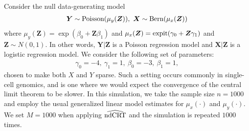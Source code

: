 \documentclass[aos]{imsart}
\theoremstyle{definition}
\theoremstyle{remark}
\newcommand{\srx}{X}									%
\newcommand{\sry}{Y}									%
\newcommand{\ndCRThat}{\widehat{\textnormal{ndCRT}}}	%
\begin{document}
 	Consider the null data-generating model 
	\begin{align*}
		\bm Y\sim \textnormal{Poisson}(\mu_y(\bm Z)),\ \bm X\sim \textnormal{Bern}(\mu_x(\bm Z))
	\end{align*}
	where $\mu_y(\bm Z)=\exp(\beta_0+\bm Z\beta_1)$ and $\mu_x(\bm Z)=\textnormal{expit}(\gamma_0+\bm Z\gamma_1)$ and $\bm Z\sim N(0,1)$. In other words,
	$\bm Y|\bm Z$ is a Poisson regression model and $\bm X|\bm Z$ is a logistic regression model. We consider the following set of parameters:
	\begin{align*}
		\gamma_0=-4,\ \gamma_1=1,\ \beta_0= -3,\ \beta_1= 1,
	\end{align*}
	chosen to make both $\srx$ and $\sry$ sparse. Such a setting occurs commonly in single-cell genomics, and is one where we would expect the convergence of the central limit theorem to be slower. In this simulation, we take the sample size $n=1000$ and employ the usual generalized linear model estimates for $\mu_{x}(\cdot)$ and $\mu_y(\cdot)$. We set $M=1000$ when applying $\ndCRThat$ and the simulation is repeated $1000$ times. 
\end{document}
